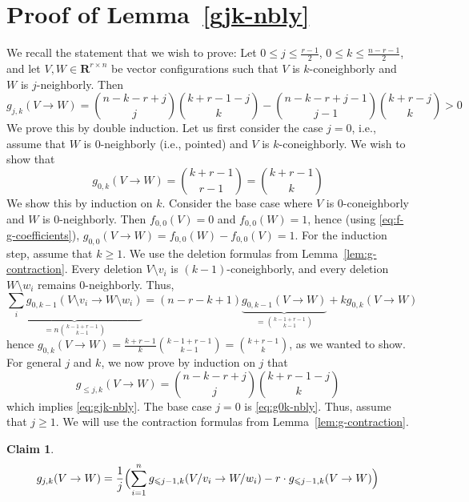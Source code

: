 \documentclass[11pt]{article}
\newtheorem{claim}[theorem]{Claim}
\renewcommand{\leq}{\leqslant}
\renewcommand{\geq}{\geqslant}
\newcommand{\R}{\mathbf{R}}
\begin{document}
\section{Proof of Lemma~\ref{gjk-nbly}}
\label{sec:proof-gjk-nbly}
%
We recall the statement that we wish to prove: Let $0\leq j\leq \frac{r-1}{2}$, $0\leq k\leq \frac{n-r-1}{2}$, and let $V,W \in \R^{r\times n}$ be vector configurations such that $V$ is $k$-coneighborly and $W$ is $j$-neighborly. Then 
\begin{equation*}
\textstyle g_{j,k}(V\to W)=\binom{n-k-r+j}{j}\binom{k+r-1-j}{k} - \binom{n-k-r+j-1}{j-1} \binom{k+r-j}{k} > 0
\end{equation*}
We prove this by double induction. Let us first consider the case $j=0$, i.e., assume that $W$ is $0$-neighborly (i.e., pointed) and $V$ is $k$-coneighborly. We wish to show that
\begin{equation}
\label{eq:g0k-nbly}
g_{0,k}(V\to W)=\binom{k+r-1}{r-1}=\binom{k+r-1}{k}
\end{equation}
We show this by induction on $k$. Consider the base case where $V$ is $0$-coneighborly and $W$ is $0$-neighborly. Then $f_{0,0}(V)=0$ and $f_{0,0}(W)=1$, hence (using  \eqref{eq:f-g-coefficients}), $g_{0,0}(V\to W)=f_{0,0}(W)-f_{0,0}(V)=1$. 
For the induction step, assume that $k\geq 1$. We use the deletion formulas from Lemma~\ref{lem:g-contraction}. Every deletion $V\setminus v_i$ is $(k-1)$-coneighborly, and every deletion $W\setminus w_i$ remains $0$-neighborly. Thus,
\[
\underbrace{\sum_i g_{0,k-1}(V\setminus v_i \to W\setminus w_i)}_{=n\binom{k-1+r-1}{k-1}}=(n-r-k+1)\underbrace{g_{0,k-1}(V\to W)}_{=\binom{k-1+r-1}{k-1}} + k g_{0,k}(V\to W)
\]
hence $g_{0,k}(V\to W)=\frac{k+r-1}{k}\binom{k-1+r-1}{k-1}=\binom{k+r-1}{k}$, as we wanted to show.
%
For general $j$ and $k$, we now prove by induction on $j$ that 
\begin{equation}
\label{eq:gleqjk-nbly}
g_{\leq j, k}(V\to W) = \binom{n-k-r+j}{j} \binom{k+r-1-j}{k}
\end{equation}
which implies \eqref{eq:gjk-nbly}.
The base case $j=0$ is \eqref{eq:g0k-nbly}. Thus, assume that $j\geq 1$. We will use the contraction formulas from Lemma~\ref{lem:g-contraction}. 
\begin{claim}
\[ g_{j,k}(V \to W) = \dfrac{1}{j} \Bigl(\sum_{i=1}^n g_{\leq j-1, k}(V/v_i \to W/w_i) - r \cdot g_{\leq j-1, k}(V \to W) \Bigr) \]
\end{claim}
\end{document}
